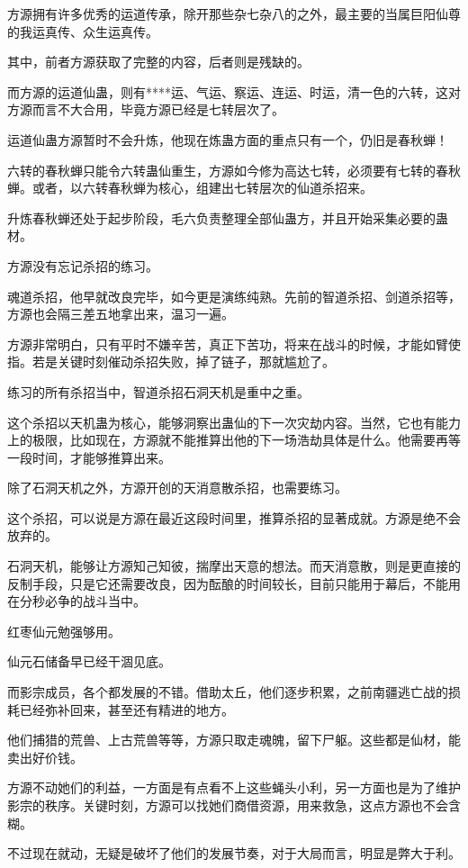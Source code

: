 \begin{this_body}
方源拥有许多优秀的运道传承，除开那些杂七杂八的之外，最主要的当属巨阳仙尊的我运真传、众生运真传。

其中，前者方源获取了完整的内容，后者则是残缺的。

而方源的运道仙蛊，则有****运、气运、察运、连运、时运，清一色的六转，这对方源而言不大合用，毕竟方源已经是七转层次了。

运道仙蛊方源暂时不会升炼，他现在炼蛊方面的重点只有一个，仍旧是春秋蝉！

六转的春秋蝉只能令六转蛊仙重生，方源如今修为高达七转，必须要有七转的春秋蝉。或者，以六转春秋蝉为核心，组建出七转层次的仙道杀招来。

升炼春秋蝉还处于起步阶段，毛六负责整理全部仙蛊方，并且开始采集必要的蛊材。

方源没有忘记杀招的练习。

魂道杀招，他早就改良完毕，如今更是演练纯熟。先前的智道杀招、剑道杀招等，方源也会隔三差五地拿出来，温习一遍。

方源非常明白，只有平时不嫌辛苦，真正下苦功，将来在战斗的时候，才能如臂使指。若是关键时刻催动杀招失败，掉了链子，那就尴尬了。

练习的所有杀招当中，智道杀招石洞天机是重中之重。

这个杀招以天机蛊为核心，能够洞察出蛊仙的下一次灾劫内容。当然，它也有能力上的极限，比如现在，方源就不能推算出他的下一场浩劫具体是什么。他需要再等一段时间，才能够推算出来。

除了石洞天机之外，方源开创的天消意散杀招，也需要练习。

这个杀招，可以说是方源在最近这段时间里，推算杀招的显著成就。方源是绝不会放弃的。

石洞天机，能够让方源知己知彼，揣摩出天意的想法。而天消意散，则是更直接的反制手段，只是它还需要改良，因为酝酿的时间较长，目前只能用于幕后，不能用在分秒必争的战斗当中。

红枣仙元勉强够用。

仙元石储备早已经干涸见底。

而影宗成员，各个都发展的不错。借助太丘，他们逐步积累，之前南疆逃亡战的损耗已经弥补回来，甚至还有精进的地方。

他们捕猎的荒兽、上古荒兽等等，方源只取走魂魄，留下尸躯。这些都是仙材，能卖出好价钱。

方源不动她们的利益，一方面是有点看不上这些蝇头小利，另一方面也是为了维护影宗的秩序。关键时刻，方源可以找她们商借资源，用来救急，这点方源也不会含糊。

不过现在就动，无疑是破坏了他们的发展节奏，对于大局而言，明显是弊大于利。


\end{this_body}

